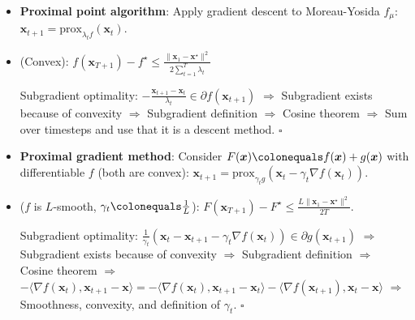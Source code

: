 \documentclass[8pt,a4paper]{extarticle}
\renewcommand{\proof}[1]{\begin{tcolorbox}#1 \hfill $\square$\end{tcolorbox}}
\renewcommand{\vec}[1]{\bm{#1}}
\newenvironment{topic}[1]
{\textbf{\sffamily \colorbox{black}{\rlap{\textbf{\textcolor{white}{#1}}}\hspace{\linewidth}\hspace{-2\fboxsep}}} \\ \vspace{0.2cm}}
{}
\begin{document}
\begin{multicols*}{2}
    \begin{topic}{Proximal algorithms}
        \begin{itemize}
            \item \textbf{Proximal point algorithm}: Apply gradient descent to Moreau-Yosida $f_{\mu}$: $\vec{x}_{t+1} = \mathrm{prox}_{\lambda_t f}(\vec{x}_t)$.
            \item (Convex): $f(\vec{x}_{T+1}) - f^\star \leq \frac{\| \vec{x}_1 - \vec{x}^\star \|^2}{2 \sum_{t=1}^{T} \lambda_t}$
                  \proof{Subgradient optimality: $-\frac{\vec{x}_{t+1} - \vec{x}_t}{\lambda_t} \in \partial f(\vec{x}_{t+1})$ $\Rightarrow$ Subgradient exists because of convexity $\Rightarrow$ Subgradient definition $\Rightarrow$ Cosine theorem $\Rightarrow$ Sum over timesteps and use that it is a descent method.}
            \item \textbf{Proximal gradient method}: Consider $F(\vec{x}) \colonequals f(\vec{x}) + g(\vec{x})$ with differentiable $f$ (both are convex): $\vec{x}_{t+1} = \mathrm{prox}_{\gamma_t g}(\vec{x}_t - \gamma_t \nabla f(\vec{x}_t))$.
            \item ($f$ is $L$-smooth, $\gamma_t \colonequals \frac{1}{L}$): $F(\vec{x}_{T+1}) - F^\star \leq \frac{L \| \vec{x}_1 - \vec{x}^\star \|^2}{2T}$.
                  \proof{Subgradient optimality: $\frac{1}{\gamma_t} (\vec{x}_t - \vec{x}_{t+1} - \gamma_t \nabla f(\vec{x}_t)) \in \partial g(\vec{x}_{t+1})$ $\Rightarrow$ Subgradient exists because of convexity $\Rightarrow$ Subgradient definition $\Rightarrow$ Cosine theorem $\Rightarrow$ $- \langle \nabla f(\vec{x}_t), \vec{x}_{t+1} - \vec{x} \rangle = - \langle \nabla f(\vec{x}_t), \vec{x}_{t+1} - \vec{x}_t \rangle - \langle \nabla f(\vec{x}_{t+1}), \vec{x}_t - \vec{x} \rangle$ $\Rightarrow$ Smoothness, convexity, and definition of $\gamma_t$.}
        \end{itemize}
    \end{topic}


\end{multicols*}
\end{document}
